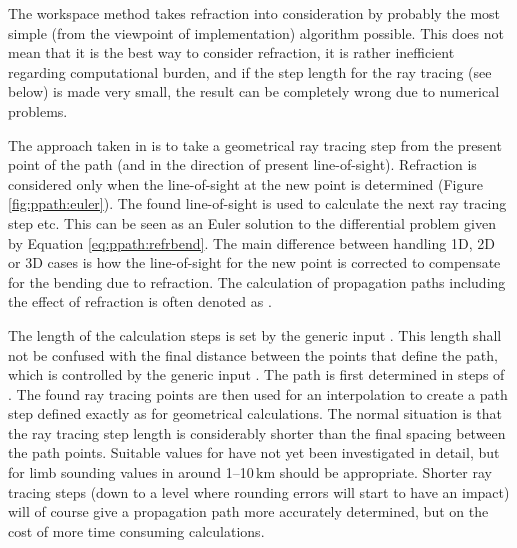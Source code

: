 The workspace method  takes
refraction into consideration by probably the most simple (from the
viewpoint of implementation) algorithm possible. This does not mean
that it is the best way to consider refraction, it is rather
inefficient regarding computational burden, and if the step length for
the ray tracing (see below) is made very small, the result can be
completely wrong due to numerical problems.

The approach taken in  is to
take a geometrical ray tracing step from the present point of the path
(and in the direction of present line-of-sight). Refraction is
considered only when the line-of-sight at the new point is determined
(Figure \ref{fig:ppath:euler}). The found line-of-sight is used to
calculate the next ray tracing step etc. This can be seen as an Euler
solution to the differential problem given by
Equation \ref{eq:ppath:refrbend}. The main difference between handling
1D, 2D or 3D cases is how the line-of-sight for the new point is
corrected to compensate for the bending due to refraction. The
calculation of propagation paths including the effect of refraction is
often denoted as .

The length of the calculation steps is set by the generic input
. This length shall not be confused with the
final distance between the points that define the path, which is
controlled by the generic input . The path is first
determined in steps of . The found ray tracing
points are then used for an interpolation to create a path step
defined exactly as for geometrical calculations. The normal situation
is that the ray tracing step length is considerably shorter than the
final spacing between the path points. Suitable values for
 have not yet been investigated in detail, but
for limb sounding values in around 1--10\,km should be appropriate.
Shorter ray tracing steps (down to a level where rounding errors will
start to have an impact) will of course give a propagation path more
accurately determined, but on the cost of more time consuming
calculations.


